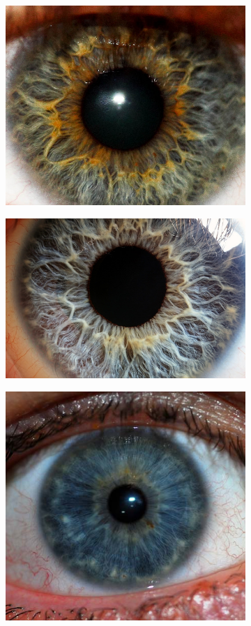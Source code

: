 \documentclass{article}
\begin{document}
\begin{figure}[H]
\begin{subfigure}{.5\textwidth}
    \caption{}
  \label{fig:sample_2}
\end{subfigure}
\begin{subfigure}{.5\textwidth}
  \centering
  \includegraphics[width=0.97\linewidth]{_Figures/raw_data_3.jpg}
  \caption{}
  \label{fig:sample_3}
\end{subfigure}%
\begin{subfigure}{.5\textwidth}
  \centering
  \includegraphics[width=0.97\linewidth]{_Figures/raw_data_4.jpg}
    \caption{}
  \label{fig:sample_4}
\end{subfigure}
\begin{subfigure}{.5\textwidth}
  \centering
  \includegraphics[width=0.6\linewidth]{_Figures/raw_data_5.jpg}

\end{subfigure}
\end{figure}
\end{document}
